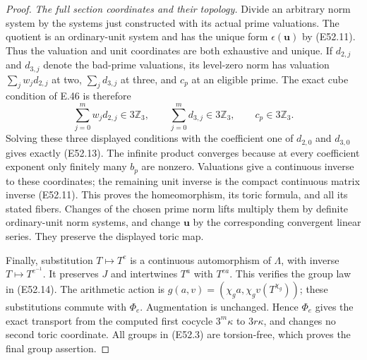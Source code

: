 \begin{proof}
\emph{The full section coordinates and their topology.}
Divide an arbitrary
norm system by
the systems just
constructed with
its actual prime
valuations. The
quotient is an
ordinary-unit
system and has
the unique form
$\epsilon(\boldsymbol u)$
by (E52.11).
Thus the valuation
and unit coordinates
are both exhaustive
and unique.
If $d_{2,j}$ and
$d_{3,j}$ denote
the bad-prime
valuations, its
level-zero norm
has valuation
$\sum_jw_jd_{2,j}$
at two,
$\sum_jd_{3,j}$
at three, and
$c_p$ at an
eligible prime.
The exact cube
condition of E.46
is therefore
\[
 \sum_{j=0}^m w_jd_{2,j}\in3\mathbb Z_3,\qquad
 \sum_{j=0}^m d_{3,j}\in3\mathbb Z_3,\qquad
 c_p\in3\mathbb Z_3.
 \tag{E52.25}
\]
Solving these
three displayed
conditions with
the coefficient
one of $d_{2,0}$
and $d_{3,0}$
gives exactly
(E52.13).
The infinite
product converges
because at every
coefficient exponent
only finitely
many $b_p$ are
nonzero. Valuations
give a continuous
inverse to these
coordinates; the
remaining unit
inverse is the
compact continuous
matrix inverse
(E52.11).
This proves the
homeomorphism,
its toric formula,
and all its
stated fibers.
Changes of the
chosen prime
norm lifts
multiply them
by definite
ordinary-unit
norm systems,
and change
$\boldsymbol u$
by the corresponding
convergent linear
series. They
preserve the
displayed toric
map.

Finally,
substitution
$T\mapsto T^e$
is a continuous
automorphism of
$\Lambda$, with
inverse
$T\mapsto T^{e^{-1}}$.
It preserves $J$
and intertwines
$T^a$ with
$T^{ea}$.
This verifies
the group law
in (E52.14).
The arithmetic
action is
$g(a,v)=(\chi_g a,
\chi_g v(T^{\chi_g}))$;
these substitutions
commute with
$\Phi_e$.
Augmentation
is unchanged.
Hence
$\Phi_e$ gives
the exact
transport from
the computed
first cocycle
$3^m\kappa$
to $3r\kappa$,
and changes
no second
toric coordinate.
All groups in
(E52.3) are
torsion-free,
which proves
the final group
assertion.


\end{proof}
